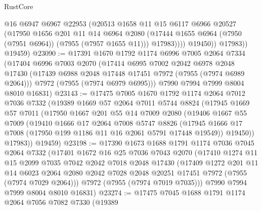 \begin{lexlean}{RustCore}
\begin{coremodule}
                  @16
                  @6947
                  @6967
                  @22953
                  (@20513
                    @1658
                    @11
                    @15
                    @6117
                    @6966
                    @20527
                    (@17950
                      @1656
                      @201
                      @11
                      @14
                      @6964
                      @2080
                      (@17444 @1655 @6964 (@7950 (@7951 @6964)) (@7955 (@7957 @1655 @11)))
                      @17983))))
              @19450))
          @17983))
      @19459)
@23090 := @17391
    @1670
    @1792
    @1174
    @6996
    @7005
    @2064
    @7334
    (@17404
      @6996
      @7003
      @2070
      (@17414
        @6995
        @7002
        @2042
        @6978
        @2048
        @17430
        (@17439 @6988 @2048 @17448 @17451 @7972 (@7955 (@7974 @6989 @2064)))
        @7972
        (@7955 (@7974 @6979 @6995)))
      @7990
      @7994
      @7999
      @8004
      @8010
      @16831)
@23143 := @17475
    @7005
    @1670
    @1792
    @1174
    @2064
    @7012
    @7036
    @7332
    (@19389
      @1669
      @57
      @2064
      @7011
      @5744
      @8824
      (@17945
        @1669
        @57
        @7011
        (@17950
          @1667
          @201
          @55
          @14
          @7009
          @2080
          (@19406
            @1667
            @55
            @7009
            (@19410
              @1666
              @17
              @2064
              @7008
              @5747
              @8826
              (@17945 @1666 @17 @7008 (@17950 @199 @1186 @11 @16 @2061 @5791 @17448 @19549))
              @19450))
          @17983))
      @19459)
@23198 := @17390
    @1673
    @1688
    @1791
    @1174
    @7036
    @7045
    @2064
    @7332
    (@17401
      @1672
      @16
      @25
      @7036
      @7043
      @2070
      (@17410
        @1274
        @11
        @15
        @2099
        @7035
        @7042
        @2042
        @7018
        @2048
        @17430
        (@17409
          @1272
          @201
          @11
          @14
          @6023
          @2064
          @2080
          @2042
          @7028
          @2048
          @20251
          @17451
          @7972
          (@7955 (@7974 @7029 @2064)))
        @7972
        (@7955 (@7974 @7019 @7035)))
      @7990
      @7994
      @7999
      @8004
      @8010
      @16831)
@23274 := @17475
    @7045
    @1688
    @1791
    @1174
    @2064
    @7056
    @7082
    @7330
    (@19389

\end{coremodule}
\end{lexlean}

